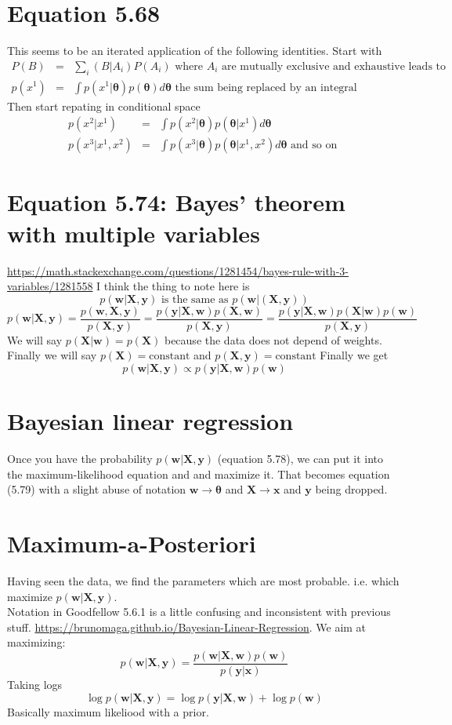\documentclass{article}
\newcommand{\beq}{\begin{equation}}
\newcommand{\eeq}{\end{equation}}
\newcommand{\ber}{\begin{eqnarray}}
\newcommand{\eer}{\end{eqnarray}}
\begin{document}
\section{Equation 5.68}
This seems to be an iterated application of the following identities.
Start with
\ber
P(B)  &=& \sum_i(B|A_i)P(A_i) \text{ where $A_i$ are mutually exclusive and exhaustive leads to }\\
p(x^1)&=&\int p(x^1|\pmb{\theta})p(\pmb{\theta})d\pmb{\theta}  \text{ the sum being replaced by an integral }
\eer
Then start repating in conditional space
\ber
p(x^2|x^1)&=&\int p(x^2|\pmb{\theta})p(\pmb{\theta}|x^1)d\pmb{\theta} \\
p(x^3|x^1,x^2)&=&\int p(x^3|\pmb{\theta})p(\pmb{\theta}|x^1,x^2)d\pmb{\theta} \text{ and so on }
\eer
\section{Equation 5.74: Bayes' theorem with multiple variables}
\url{https://math.stackexchange.com/questions/1281454/bayes-rule-with-3-variables/1281558}
I think the thing to note here is
\beq
p(\pmb{w}|\pmb{X},\pmb{y}) \text { is the same as }   p(\pmb{w}|(\pmb{X},\pmb{y})) 
\eeq
\beq
p(\pmb{w}|\pmb{X},\pmb{y}) = \frac{p(\pmb{w},\pmb{X},\pmb{y})}{p(\pmb{X},\pmb{y})} = \frac{p(\pmb{y}|\pmb{X},\pmb{w})p(\pmb{X},\pmb{w})}{p(\pmb{X},\pmb{y})}
=\frac{p(\pmb{y}|\pmb{X},\pmb{w})p(\pmb{X}|\pmb{w})p(\pmb{w})}{p(\pmb{X},\pmb{y})}
\eeq
We will say $p(\pmb{X}|\pmb{w})=p(\pmb{X})$ because the data does not depend of weights. Finally we will say $p(\pmb{X})=\text{constant}$ and $p(\pmb{X},\pmb{y})=\text{constant}$
Finally we get
\beq
p(\pmb{w}|\pmb{X},\pmb{y}) \propto  p(\pmb{y}|\pmb{X},\pmb{w})p(\pmb{w})
\eeq
\section{Bayesian linear regression}
Once you have the probability $p(\pmb{w}|\pmb{X},\pmb{y})$ (equation 5.78), we can put it into the maximum-likelihood equation and and maximize it. That becomes equation (5.79) with a slight abuse of notation $\pmb{w}\rightarrow{\pmb{\theta}}$ and $\pmb{X}\rightarrow{\pmb{x}}$ and $\pmb{y}$ being dropped.
%
%
%
\section{Maximum-a-Posteriori}
Having seen the data, we find the parameters which are most probable. i.e. which maximize $p(\pmb{w}|\pmb{X},\pmb{y})$.\\
Notation in Goodfellow 5.6.1 is a little confusing and inconsistent with previous stuff. \url{https://brunomaga.github.io/Bayesian-Linear-Regression}. We aim at maximizing:
\beq
p(\pmb{w}|\pmb{X},\pmb{y}) = \frac{p(\pmb{w}|\pmb{X},\pmb{w})p(\pmb{w})}{p(\pmb{y}|\pmb{x})}
\eeq
%
Taking logs
\beq
\log{p(\pmb{w}|\pmb{X},\pmb{y})} = \log{p(\pmb{y}|\pmb{X},\pmb{w})} + \log{p(\pmb{w})}
\eeq
Basically maximum likeliood with a prior.
%
%
\end{document}
